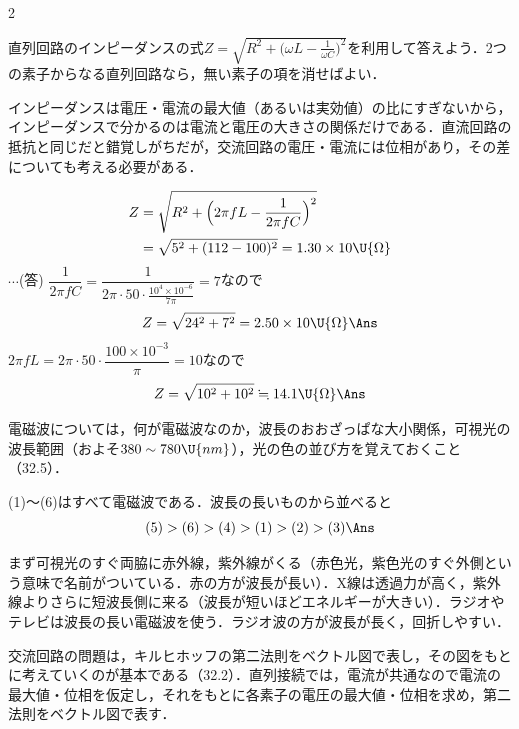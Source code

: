 \begin{multicols}{2}
\raggedcolumns

\par\nopagebreak
\begin{sisin}
直列回路のインピーダンスの式$Z=\sqrt{R^2+\bigl(\omega L-\frac{1}{\omega C}\bigr)^2}$を利用して答えよう．2つの素子からなる直列回路なら，無い素子の項を消せばよい．

インピーダンスは電圧・電流の最大値（あるいは実効値）の比にすぎないから，インピーダンスで分かるのは電流と電圧の大きさの関係だけである．直流回路の抵抗と同じだと錯覚しがちだが，交流回路の電圧・電流には位相があり，その差についても考える必要がある．
\end{sisin}
\KaiHead
\begin{komon}
 \[\begin{aligned}Z&=\sqrt{R^2+\Bigl(2\pi fL-\frac{1}{2\pi fC}\Bigr)^2}\\&=\sqrt{5^2+(112-100)^2}=1.30\times 10\U{\Omega}\end{aligned}\]
       \hspace*{\fill}$\cdots$(答)
 $\dfrac{1}{2\pi fC}=\dfrac{1}{2\pi\cdot 50\cdot\frac{10^4\times 10^{-6}}{7\pi}}=7$なので
       \[Z=\sqrt{24^2+7^2}=2.50\times 10\U{\Omega}\Ans\]
 $2\pi fL=2\pi\cdot 50\cdot\dfrac{100\times 10^{-3}}{\pi}=10$なので
       \[Z=\sqrt{10^2+10^2}\fallingdotseq 14.1\U{\Omega}\Ans\]
\end{komon}

\par\nopagebreak
\begin{sisin}
電磁波については，何が電磁波なのか，波長のおおざっぱな大小関係，可視光の波長範囲（およそ$380\sim 780\U{nm}$），光の色の並び方を覚えておくこと（32.5）．
\end{sisin}
\KaiHead
(1)〜(6)はすべて電磁波である．波長の長いものから並べると
\[(5)>(6)>(4)>(1)>(2)>(3)\Ans\]
\begin{chuu}
まず可視光のすぐ両脇に赤外線，紫外線がくる（赤色光，紫色光のすぐ外側という意味で名前がついている．赤の方が波長が長い）．X線は透過力が高く，紫外線よりさらに短波長側に来る（波長が短いほどエネルギーが大きい）．ラジオやテレビは波長の長い電磁波を使う．ラジオ波の方が波長が長く，回折しやすい．
\end{chuu}

\par\nopagebreak
\begin{sisin}
交流回路の問題は，キルヒホッフの第二法則をベクトル図で表し，その図をもとに考えていくのが基本である（32.2）．直列接続では，電流が共通なので電流の最大値・位相を仮定し，それをもとに各素子の電圧の最大値・位相を求め，第二法則をベクトル図で表す．


\end{sisin}
\end{multicols}

